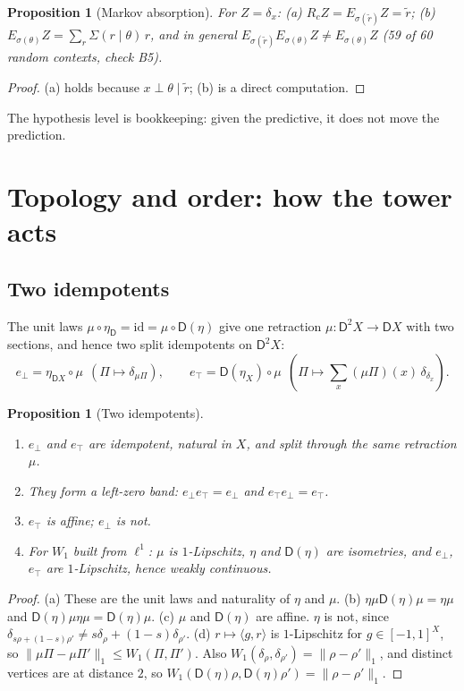 \documentclass[11pt]{article}
\newtheorem{proposition}[theorem]{Proposition}
\theoremstyle{definition}
\newcommand{\D}{\mathsf D}
\newcommand{\id}{\mathrm{id}}
\newcommand{\ebot}{e_{\perp}}
\newcommand{\etop}{e_{\top}}
\newcommand{\rr}{\tilde r}
\begin{document}
\begin{proposition}[Markov absorption]\label{prop:absorb}
For $Z=\delta_x$: (a) $R_cZ=E_{\sigma(\rr)}Z=\rr$; (b) $E_{\sigma(\theta)}Z=\sum_r\Sigma(r\mid\theta)\,r$, and in general
$E_{\sigma(\rr)}E_{\sigma(\theta)}Z\ne E_{\sigma(\theta)}Z$ (59 of 60 random contexts, check B5).
\end{proposition}
\begin{proof}
(a) holds because $x\perp\theta\mid\rr$; (b) is a direct computation.
\end{proof}

The hypothesis level is bookkeeping: given the predictive, it does not move the prediction.

\section{Topology and order: how the tower acts}\label{sec:topology}

\subsection{Two idempotents}
The unit laws $\mu\circ\eta_{\D}=\id=\mu\circ\D(\eta)$ give one retraction $\mu\colon\D^2X\to\D X$ with two sections, and hence two
split idempotents on $\D^2X$:
\[
\ebot=\eta_{\D X}\circ\mu\ \ (\Pi\mapsto\delta_{\mu\Pi}),\qquad
\etop=\D(\eta_X)\circ\mu\ \ (\Pi\mapsto\textstyle\sum_x(\mu\Pi)(x)\,\delta_{\delta_x}).
\]

\begin{proposition}[Two idempotents]\label{prop:two-idempotents}
\begin{enumerate}[label=(\alph*)]
\item $\ebot$ and $\etop$ are idempotent, natural in $X$, and split through the same retraction $\mu$.
\item They form a left-zero band: $\ebot\etop=\ebot$ and $\etop\ebot=\etop$.
\item $\etop$ is affine; $\ebot$ is not.
\item For $W_1$ built from $\ell^1$: $\mu$ is $1$-Lipschitz, $\eta$ and $\D(\eta)$ are isometries, and $\ebot$, $\etop$ are
  $1$-Lipschitz, hence weakly continuous.
\end{enumerate}
\end{proposition}
\begin{proof}
(a) These are the unit laws and naturality of $\eta$ and $\mu$.
(b) $\eta\mu\D(\eta)\mu=\eta\mu$ and $\D(\eta)\mu\eta\mu=\D(\eta)\mu$.
(c) $\mu$ and $\D(\eta)$ are affine. $\eta$ is not, since $\delta_{s\rho+(1-s)\rho'}\ne s\delta_\rho+(1-s)\delta_{\rho'}$.
(d) $r\mapsto\langle g,r\rangle$ is $1$-Lipschitz for $g\in[-1,1]^X$, so $\lVert\mu\Pi-\mu\Pi'\rVert_1\le W_1(\Pi,\Pi')$. Also
$W_1(\delta_\rho,\delta_{\rho'})=\lVert\rho-\rho'\rVert_1$, and distinct vertices are at distance $2$, so
$W_1(\D(\eta)\rho,\D(\eta)\rho')=\lVert\rho-\rho'\rVert_1$.
\end{proof}
\end{document}
